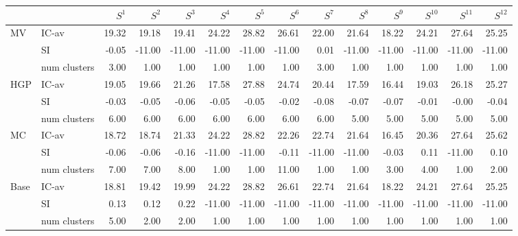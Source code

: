\begin{tabular}{llrrrrrrrrrrrr}
\toprule
 &  & $S^{1}$ & $S^{2}$ & $S^{3}$ & $S^{4}$ & $S^{5}$ & $S^{6}$ & $S^{7}$ & $S^{8}$ & $S^{9}$ & $S^{10}$ & $S^{11}$ & $S^{12}$ \\
\midrule
\multirow[c]{3}{*}{MV} & IC-av & 19.32 & 19.18 & 19.41 & 24.22 & 28.82 & 26.61 & 22.00 & 21.64 & 18.22 & 24.21 & 27.64 & 25.25 \\
 & SI & -0.05 & -11.00 & -11.00 & -11.00 & -11.00 & -11.00 & 0.01 & -11.00 & -11.00 & -11.00 & -11.00 & -11.00 \\
 & num clusters & 3.00 & 1.00 & 1.00 & 1.00 & 1.00 & 1.00 & 3.00 & 1.00 & 1.00 & 1.00 & 1.00 & 1.00 \\
\multirow[c]{3}{*}{HGP} & IC-av & 19.05 & 19.66 & 21.26 & 17.58 & 27.88 & 24.74 & 20.44 & 17.59 & 16.44 & 19.03 & 26.18 & 25.27 \\
 & SI & -0.03 & -0.05 & -0.06 & -0.05 & -0.05 & -0.02 & -0.08 & -0.07 & -0.07 & -0.01 & -0.00 & -0.04 \\
 & num clusters & 6.00 & 6.00 & 6.00 & 6.00 & 6.00 & 6.00 & 6.00 & 5.00 & 5.00 & 5.00 & 5.00 & 5.00 \\
\multirow[c]{3}{*}{MC} & IC-av & 18.72 & 18.74 & 21.33 & 24.22 & 28.82 & 22.26 & 22.74 & 21.64 & 16.45 & 20.36 & 27.64 & 25.62 \\
 & SI & -0.06 & -0.06 & -0.16 & -11.00 & -11.00 & -0.11 & -11.00 & -11.00 & -0.03 & 0.11 & -11.00 & 0.10 \\
 & num clusters & 7.00 & 7.00 & 8.00 & 1.00 & 1.00 & 11.00 & 1.00 & 1.00 & 3.00 & 4.00 & 1.00 & 2.00 \\
\multirow[c]{3}{*}{Base} & IC-av & 18.81 & 19.42 & 19.99 & 24.22 & 28.82 & 26.61 & 22.74 & 21.64 & 18.22 & 24.21 & 27.64 & 25.25 \\
 & SI & 0.13 & 0.12 & 0.22 & -11.00 & -11.00 & -11.00 & -11.00 & -11.00 & -11.00 & -11.00 & -11.00 & -11.00 \\
 & num clusters & 5.00 & 2.00 & 2.00 & 1.00 & 1.00 & 1.00 & 1.00 & 1.00 & 1.00 & 1.00 & 1.00 & 1.00 \\
\bottomrule
\end{tabular}
